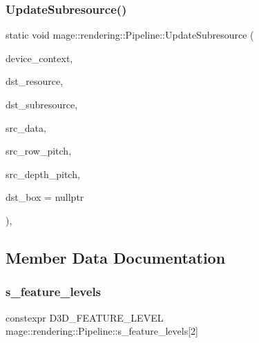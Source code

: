 \subsubsection{\texorpdfstring{Update\+Subresource()}{UpdateSubresource()}}
{\footnotesize\ttfamily static void mage\+::rendering\+::\+Pipeline\+::\+Update\+Subresource (\begin{DoxyParamCaption}\item[{I\+D3\+D11\+Device\+Context \&}]{device\+\_\+context,  }\item[{I\+D3\+D11\+Resource \&}]{dst\+\_\+resource,  }\item[{\mbox{\hyperlink{namespacemage_aa5d6eaabaac3cdd01873d6a3d27e90f3}{U32}}}]{dst\+\_\+subresource,  }\item[{const void $\ast$}]{src\+\_\+data,  }\item[{\mbox{\hyperlink{namespacemage_aa5d6eaabaac3cdd01873d6a3d27e90f3}{U32}}}]{src\+\_\+row\+\_\+pitch,  }\item[{\mbox{\hyperlink{namespacemage_aa5d6eaabaac3cdd01873d6a3d27e90f3}{U32}}}]{src\+\_\+depth\+\_\+pitch,  }\item[{const D3\+D11\+\_\+\+B\+OX $\ast$}]{dst\+\_\+box = {\ttfamily nullptr} }\end{DoxyParamCaption})\hspace{0.3cm}{\ttfamily [static]}, {\ttfamily [noexcept]}}



\subsection{Member Data Documentation}
\mbox{\label{structmage_1_1rendering_1_1_pipeline_a9748450c877ec6997796826258f3cbda}} 
\subsubsection{\texorpdfstring{s\+\_\+feature\+\_\+levels}{s\_feature\_levels}}
{\footnotesize\ttfamily constexpr D3\+D\+\_\+\+F\+E\+A\+T\+U\+R\+E\+\_\+\+L\+E\+V\+EL mage\+::rendering\+::\+Pipeline\+::s\+\_\+feature\+\_\+levels\mbox{[}2\mbox{]}\hspace{0.3cm}{\ttfamily [static]}}

